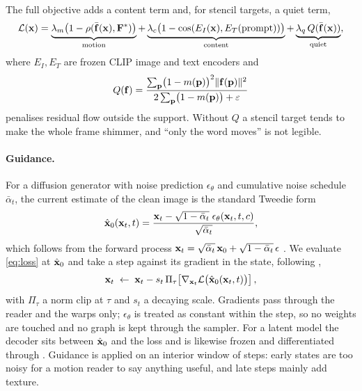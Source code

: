 The full objective adds a content term and, for stencil targets, a quiet term,
\begin{equation}
\mathcal{L}(\mathbf{x})=
\underbrace{\lambda_m\bigl(1-\rho(\bar{\mathbf{f}}(\mathbf{x}),\mathbf{F}^\ast)\bigr)}_{\text{motion}}
+\underbrace{\lambda_c\bigl(1-\cos(E_I(\mathbf{x}),E_T(\text{prompt}))\bigr)}_{\text{content}}
+\underbrace{\lambda_q\,Q(\bar{\mathbf{f}}(\mathbf{x}))}_{\text{quiet}},
\label{eq:loss}
\end{equation}
where $E_I,E_T$ are frozen CLIP image and text encoders
\cite{radford2021clip} and
\begin{equation}
Q(\mathbf{f})=\frac{\sum_{\mathbf{p}}\bigl(1-m(\mathbf{p})\bigr)^{2}\lVert\mathbf{f}(\mathbf{p})\rVert^{2}}
              {2\sum_{\mathbf{p}}\bigl(1-m(\mathbf{p})\bigr)+\varepsilon}
\label{eq:quiet}
\end{equation}
penalises residual flow outside the support. Without $Q$ a stencil target tends
to make the whole frame shimmer, and ``only the word moves'' is not legible.

\paragraph{Guidance.} For a diffusion generator with noise prediction
$\epsilon_\theta$ and cumulative noise schedule $\bar\alpha_t$, the current
estimate of the clean image is the standard Tweedie form
\begin{equation}
\hat{\mathbf{x}}_0(\mathbf{x}_t,t)=
\frac{\mathbf{x}_t-\sqrt{1-\bar\alpha_t}\;\epsilon_\theta(\mathbf{x}_t,t,c)}
     {\sqrt{\bar\alpha_t}},
\label{eq:tweedie}
\end{equation}
which follows from the forward process
$\mathbf{x}_t=\sqrt{\bar\alpha_t}\,\mathbf{x}_0+\sqrt{1-\bar\alpha_t}\,\epsilon$
\cite{ho2020ddpm}. We evaluate \eqref{eq:loss} at $\hat{\mathbf{x}}_0$ and take a step
against its gradient in the state, following
\cite{dhariwal2021guidance,bansal2023universal},
\begin{equation}
\mathbf{x}_t\;\leftarrow\;\mathbf{x}_t-s_t\,\Pi_{\tau}\!\left[
\nabla_{\mathbf{x}_t}\mathcal{L}\bigl(\hat{\mathbf{x}}_0(\mathbf{x}_t,t)\bigr)\right],
\label{eq:guidance}
\end{equation}
with $\Pi_\tau$ a norm clip at $\tau$ and $s_t$ a decaying scale. Gradients
pass through the reader and the warps only; $\epsilon_\theta$ is treated as
constant within the step, so no weights are touched and no graph is kept through
the sampler. For a latent model the decoder sits between $\hat{\mathbf{x}}_0$ and the
loss and is likewise frozen and differentiated through
\cite{rombach2022ldm,podell2024sdxl}. Guidance is applied on an interior window
of steps: early states are too noisy for a motion reader to say anything useful,
and late steps mainly add texture.

